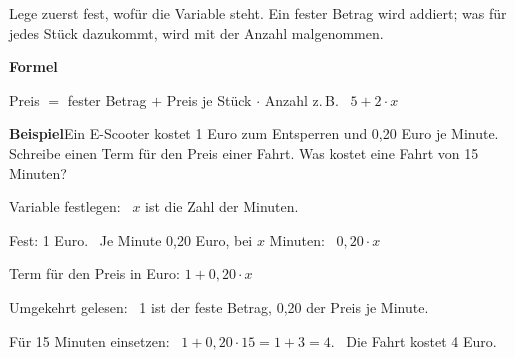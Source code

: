 \documentclass[11pt]{article}
\makeatletter
\newlength{\kr}
\newcommand{\karomerk}[2]{\protected@write\@auxout{}{\string\karoseite{#1}{#2}{\thepage}}}
\newcommand{\karoseite}[3]{\expandafter\xdef\csname karo@#1@#2\endcsname{#3}}
\makeatother
\begin{document}
\medskip
\par\vspace{3mm}\setlength{\kr}{\dimexpr\pagegoal-\pagetotal-10mm\relax}%
\ifdim\kr>12mm\karomerk{k}{C}\noindent{\scriptsize\color{mbgrau}Platz zum Rechnen}\par\nointerlineskip\vspace{1mm}\noindent
\begin{tikzpicture}\clip (0,0) rectangle ({\linewidth-0.5mm},\kr);\draw[black!16,line width=0.3pt,step=5mm] (0,0) grid (\linewidth,\kr);\end{tikzpicture}\fi\par
\clearpage\label{s:D}\noindent\colorbox{black!12}{}\hspace{3mm}{\Large\bfseries Terme in Sachaufgaben}\par\smallskip
\noindent Lege zuerst fest, wofür die Variable steht. Ein fester Betrag wird addiert; was für jedes Stück dazukommt, wird mit der Anzahl malgenommen.\par\medskip
\noindent\textbf{Formel}\par\nopagebreak\noindent\hspace*{4mm}\begin{minipage}{\dimexpr\linewidth-4mm\relax}Preis $=$ fester Betrag $+$ Preis je Stück $\cdot$ Anzahl \quad z.\,B. \ $5 + 2 \cdot x$\end{minipage}\par\medskip
\noindent\textbf{Beispiel}\quad Ein E-Scooter kostet 1 Euro zum Entsperren und 0,20 Euro je Minute. Schreibe einen Term für den Preis einer Fahrt. Was kostet eine Fahrt von 15 Minuten?\par\smallskip
\noindent\par\noindent{}Variable festlegen: \ $x$ ist die Zahl der Minuten.\par\smallskip\par\noindent{}Fest: 1 Euro. \ Je Minute 0,20 Euro, bei $x$ Minuten: \ $0{,}20 \cdot x$\par\smallskip\par\noindent{}Term für den Preis in Euro: \quad $1 + 0{,}20 \cdot x$\par\smallskip\par\noindent{}Umgekehrt gelesen: \ 1 ist der feste Betrag, 0,20 der Preis je Minute.\par\smallskip\par\noindent{}Für 15 Minuten einsetzen: \ $1 + 0{,}20 \cdot 15 = 1 + 3 = 4$. \ Die Fahrt kostet 4 Euro.\par\smallskip\par\medskip
\end{document}
